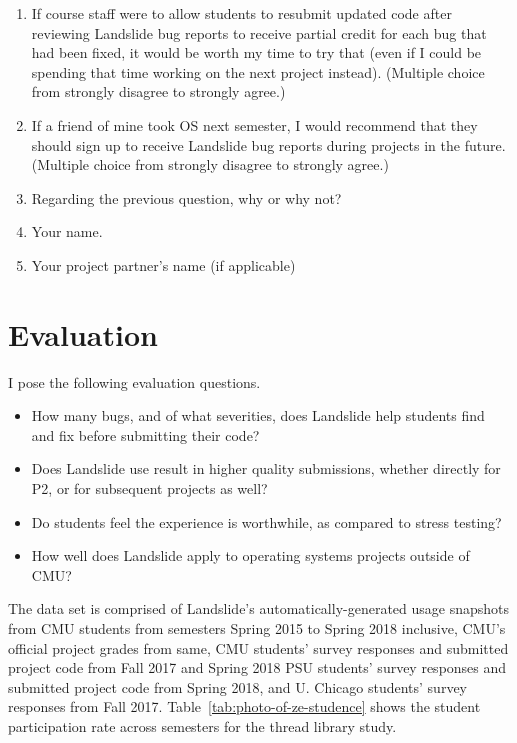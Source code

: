 \begin{enumerate}
	\item If course staff were to allow students to resubmit updated code after reviewing Landslide bug reports to receive partial credit for each bug that had been fixed, it would be worth my time to try that (even if I could be spending that time working on the next project instead).
		(Multiple choice from strongly disagree to strongly agree.)
	\item If a friend of mine took OS next semester, I would recommend that they should sign up to receive Landslide bug reports during projects in the future.
		(Multiple choice from strongly disagree to strongly agree.)
	\item Regarding the previous question, why or why not?
	\item Your name.
	\item Your project partner's name (if applicable)
\end{enumerate}


\section{Evaluation}

I pose the following evaluation questions.

\begin{itemize}
	\item How many bugs, and of what severities, does Landslide help students find and fix before submitting their code?
	\item Does Landslide use result in higher quality submissions, whether directly for P2, or for subsequent projects as well?
	\item Do students feel the experience is worthwhile, as compared to stress testing?
	\item How well does Landslide apply to operating systems projects outside of CMU?
\end{itemize}
\vspace{1em}

The data set is comprised of Landslide's automatically-generated usage snapshots
from CMU students from semesters Spring 2015 to Spring 2018 inclusive,
CMU's official project grades from same,
CMU students' survey responses and submitted project code from Fall 2017 and Spring 2018
PSU students' survey responses and submitted project code from Spring 2018,
and U. Chicago students' survey responses from Fall 2017.
Table~\ref{tab:photo-of-ze-studence} shows the student participation rate across semesters
for the thread library study.

